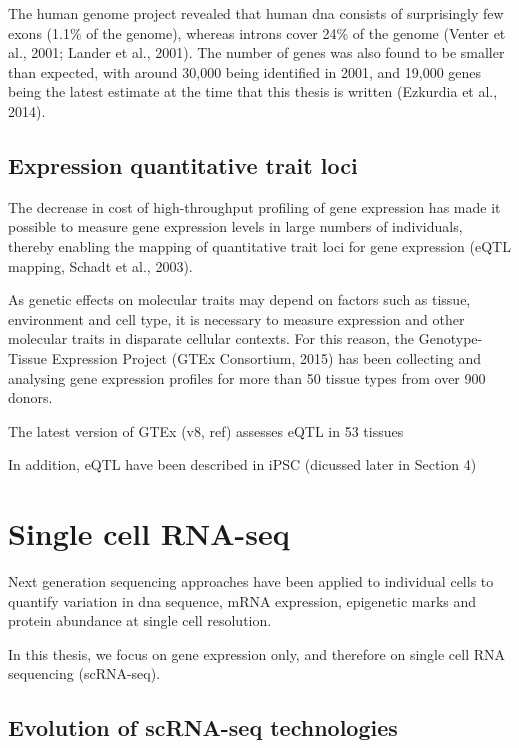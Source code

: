 The human genome project revealed that human \gls{dna}
consists of surprisingly few exons (1.1\% of the genome), whereas introns cover 24\% of the genome (Venter et al., 2001; Lander et al., 2001). 
The number of genes was also found to be smaller than expected, with around 30,000 being identified in 2001, and 19,000 genes being the latest estimate at the time that this thesis is written (Ezkurdia et al., 2014). 


\subsection{Expression quantitative trait loci}

The decrease in cost of high-throughput profiling of gene expression has made it possible to measure gene expression levels in large numbers of individuals, thereby enabling the mapping of quantitative trait loci for gene expression (eQTL mapping, Schadt et al., 2003).

As genetic effects on molecular traits may depend on factors such as tissue, environment and cell type, it is necessary to measure expression and other molecular traits in disparate cellular contexts. For this reason, the Genotype-Tissue Expression Project (GTEx Consortium, 2015) has been collecting and analysing gene expression profiles for more than 50 tissue types from over 900 donors.

The latest version of GTEx (v8, ref) assesses eQTL in 53 tissues

In addition, eQTL have been described in iPSC (dicussed later in Section 4)

\newpage

\section{Single cell RNA-seq}  %

Next generation sequencing approaches have been applied to individual cells to quantify
variation in \gls{dna} sequence, mRNA expression, epigenetic marks and protein abundance
at single cell resolution.

In this thesis, we focus on gene expression only, and therefore on single cell RNA sequencing (scRNA-seq).

\subsection{Evolution of scRNA-seq technologies}

